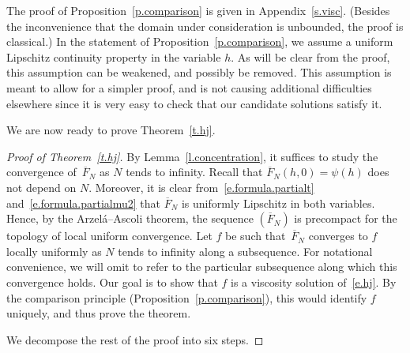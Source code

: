 \documentclass[AHL,Unicode,longabstracts,published]{cedram}
\newcommand{\1}{\mathds{1}}
\renewcommand{\bar}{\overline}
\begin{document}
The proof of Proposition~\ref{p.comparison} is given in Appendix~\ref{s.visc}. (Besides the inconvenience that the domain under consideration is unbounded, the proof is classical.) In the statement of Proposition~\ref{p.comparison}, we assume a uniform Lipschitz continuity property in the variable $h$. As will be clear from the proof, this assumption can be weakened, and possibly be removed. This assumption is meant to allow for a simpler proof, and is not causing additional difficulties elsewhere since it is very easy to check that our candidate solutions satisfy it.


We are now ready to prove Theorem~\ref{t.hj}.


\begin{proof}[Proof of Theorem~\ref{t.hj}]
By Lemma~\ref{l.concentration}, it suffices to study the convergence of~$\bar F_N$ as $N$ tends to infinity. Recall that $\bar F_N(h,0) = \psi(h)$ does not depend on $N$. Moreover, it is clear from~\eqref{e.formula.partialt} and~\eqref{e.formula.partialmu2} that $\bar F_N$ is uniformly Lipschitz in both variables. Hence, by the Arzelá--Ascoli theorem, the sequence $(\bar F_N)$ is precompact for the topology of local uniform convergence. Let $f$ be such that~$\bar F_N$ converges to $f$ locally uniformly as $N$ tends to infinity along a subsequence. For notational convenience, we will omit to refer to the particular subsequence along which this convergence holds. Our goal is to show that $f$ is a viscosity solution of~\eqref{e.hj}. By the comparison principle (Proposition~\ref{p.comparison}), this would identify $f$ uniquely, and thus prove the theorem.


We decompose the rest of the proof into six steps.



\end{proof}
\end{document}
